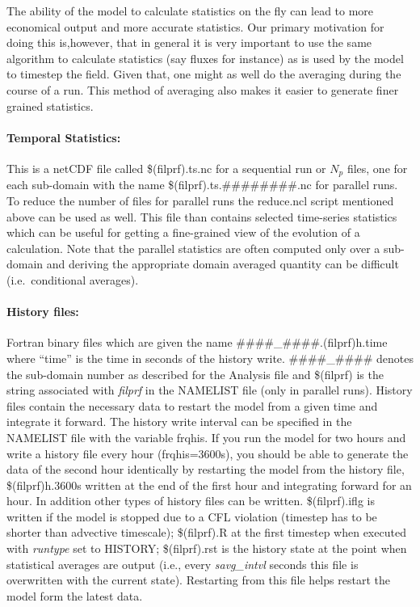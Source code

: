 \documentclass[11pt,a4paper]{article}
\begin{document}
The ability of the model to calculate statistics on the fly can
lead to more economical output and more accurate statistics.
Our primary motivation for doing this is,however, that in
general it is very important to use the same algorithm
to calculate statistics (say fluxes for instance) as is used by the
model to timestep the field. Given that, one might as well do the
averaging during the course of a run. This method of averaging also
makes it easier to generate finer grained statistics.

\paragraph{Temporal Statistics:}  This is a netCDF file called
\$(filprf).ts.nc for a sequential run or $N_p$ files,
one for each sub-domain with the name \$(filprf).ts.\#\#\#\#\#\#\#\#.nc
for parallel runs. To reduce the number of files for parallel runs
the reduce.ncl script mentioned above can be used as well.
This file than contains selected time-series statistics
which can be useful for getting a fine-grained view of the evolution of a
calculation. Note that the parallel statistics are often computed
only over a sub-domain and deriving the appropriate domain averaged
quantity can be difficult (i.e.\ conditional averages).

\paragraph{History files:}

Fortran binary files which are given the name
\#\#\#\#\_\#\#\#\#.(filprf)h.time where ``time'' is the time in seconds
of the history write. \#\#\#\#\_\#\#\#\# denotes the sub-domain number
as described for the Analysis file and \$(filprf) is the string associated
with \emph{filprf} in the NAMELIST file (only in parallel runs).
History files contain the necessary data to restart the model from
a given time and integrate it forward. The history write interval
can be specified in the NAMELIST file with the variable frqhis.
If you run the model for two hours and write a history file every
hour (frqhis=3600s), you should be able to generate the data of
the second hour identically by restarting the model from the
history file, \$(filprf)h.3600s written at the end of the first
hour and integrating forward for an hour.
In addition other types of history files can be written.
\$(filprf).iflg is written if the model is stopped due to a CFL
violation (timestep has to be shorter than advective timescale);
\$(filprf).R at the first timestep when executed with \emph{runtype}
set to HISTORY; \$(filprf).rst is the history state at the point when
statistical averages are output (i.e., every \emph{savg\_intvl} seconds
this file is overwritten with the current state). Restarting from this
file helps restart the model form the latest data.
\end{document}
